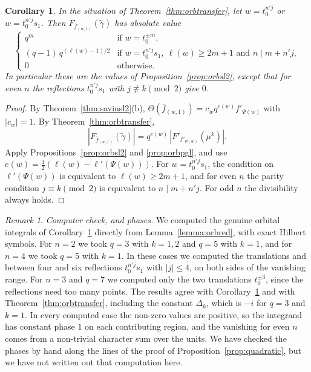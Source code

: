 \documentclass[12pt,letterpaper]{amsart}
\numberwithin{equation}{section}
\newtheorem{corollary}[theorem]{Corollary}
\theoremstyle{definition}
\theoremstyle{remark}
\newtheorem{vremark}{Remark}
\newcommand{\fbar}{\overline{f}}
\begin{document}
\begin{corollary}
\label{cor:orbgen}
In the situation of Theorem~\ref{thm:orbtransfer}, let $w=t_0^{n'j}$
or $w=t_0^{n'j}s_1$. Then $F_{\fbar_{(w,1)}}(\tilde\gamma)$ has
absolute value
\[
\begin{cases}
q^m & \mbox{if } w=t_0^{\pm m},\\
(q-1)\,q^{(\ell(w)-1)/2} & \mbox{if } w=t_0^{n'j}s_1,\ \ell(w)\geq
2m+1 \mbox{ and } n\mid m+n'j,\\
0 & \mbox{otherwise.}
\end{cases}
\]
In particular these are the values of Proposition~\ref{prop:orbsl2},
except that for even $n$ the reflections $t_0^{n'j}s_1$ with $j\not\equiv
k\pmod 2$ give $0$.
\end{corollary}

\begin{proof}
By Theorem~\ref{thm:savinsl2}(b),
$\Theta(\fbar_{(w,1)})=c_wq^{e(w)}f'_{\Psi(w)}$ with $|c_w|=1$. By
Theorem~\ref{thm:orbtransfer},
\[
|F_{\fbar_{(w,1)}}(\tilde\gamma)|=q^{e(w)}\,|F'_{f'_{\Psi(w)}}(\mu^k)| .
\]
Apply Propositions~\ref{prop:orbsl2} and \ref{prop:orbpgl}, and use
$e(w)=\frac12(\ell(w)-\ell'(\Psi(w)))$. For $w=t_0^{n'j}s_1$, the
condition on $\ell'(\Psi(w))$ is equivalent to $\ell(w)\geq 2m+1$,
and for even $n$ the parity condition $j\equiv k\pmod 2$ is equivalent
to $n\mid m+n'j$. For odd $n$ the divisibility always holds.
\end{proof}

\begin{vremark}
\label{vrem:orbphases}
\emph{Computer check, and phases.} We computed the genuine orbital
integrals of Corollary~\ref{cor:orbgen} directly from
Lemma~\ref{lemma:orbred}, with exact Hilbert symbols. For $n=2$ we
took $q=3$ with $k=1,2$ and $q=5$ with $k=1$, and for $n=4$ we took
$q=5$ with $k=1$. In these cases we computed the translations and between
four and six reflections $t_0^{n'j}s_1$ with $|j|\leq 4$, on both sides
of the vanishing range. For $n=3$ and $q=7$ we
computed only the two translations $t_0^{\pm3}$, since the reflections
need too many points. The results agree with
Corollary~\ref{cor:orbgen} and with Theorem~\ref{thm:orbtransfer},
including the constant $\Delta_k$, which is $-i$ for $q=3$ and $k=1$. In every computed case the non-zero values
are positive, so the integrand has constant phase $1$ on each
contributing region, and the vanishing for even $n$ comes from a
non-trivial character sum over the units. We have checked the phases by
hand along the lines of the proof of
Proposition~\ref{prop:quadratic}, but we have not written out that
computation here.
\end{vremark}
\end{document}
